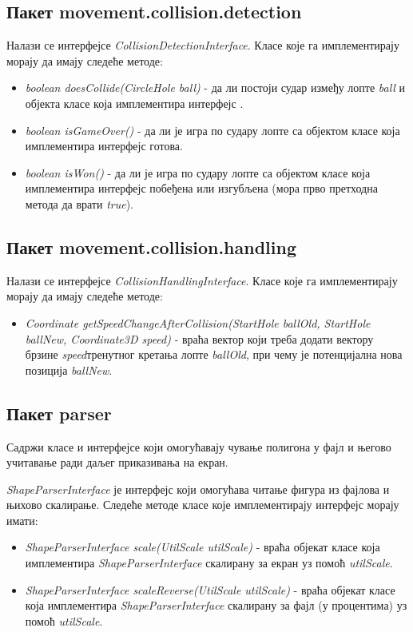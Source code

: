 \subsection{Пакет movement.collision.detection}
Налази се интерфејсе \emph{CollisionDetectionInterface}. Класе које га имплементирају морају да имају следеће методе:
\begin{itemize}
\item \emph{boolean doesCollide(CircleHole ball)} - да ли постоји судар између лопте \emph{ball} и објекта класе која имплементира интерфејс .
\item \emph{boolean isGameOver()} - да ли је игра по судару лопте са  објектом класе која имплементира интерфејс готова.
\item \emph{boolean isWon()} - да ли је игра по судару лопте са  објектом класе  која имплементира интерфејс побеђена или изгубљена (мора прво претходна метода да врати \emph{true}).
\end{itemize}
\subsection{Пакет movement.collision.handling}
Налази се интерфејсе \emph{CollisionHandlingInterface}. Класе које га имплементирају морају да имају следеће методе:
\begin{itemize}
\item \emph{Coordinate getSpeedChangeAfterCollision(StartHole ballOld, StartHole ballNew, Coordinate3D speed)} - враћа вектор који треба додати вектору брзине \emph{speed}тренутног кретања лопте \emph{ballOld}, при чему је потенцијална нова позиција \emph{ballNew}. 
\end{itemize}

\subsection{Пакет parser}
	
Садржи класе и интерфејсе који омогућавају чување полигона у фајл и његово учитавање ради даљег приказивања на екран.

\emph{ShapeParserInterface} је интерфејс који омогућава читање фигура из фајлова и њихово скалирање. Следеће методе класе које имплементирају интерфејс морају имати:
\begin{itemize}
\item \emph{ShapeParserInterface scale(UtilScale utilScale)} - враћа објекат класе која имплементира \emph{ShapeParserInterface} скалирану за екран уз помоћ \emph{utilScale}.
\item \emph{ShapeParserInterface scaleReverse(UtilScale utilScale)} - враћа објекат класе која имплементира \emph{ShapeParserInterface} скалирану за фајл (у процентима) уз помоћ \emph{utilScale}.
\end{itemize}

